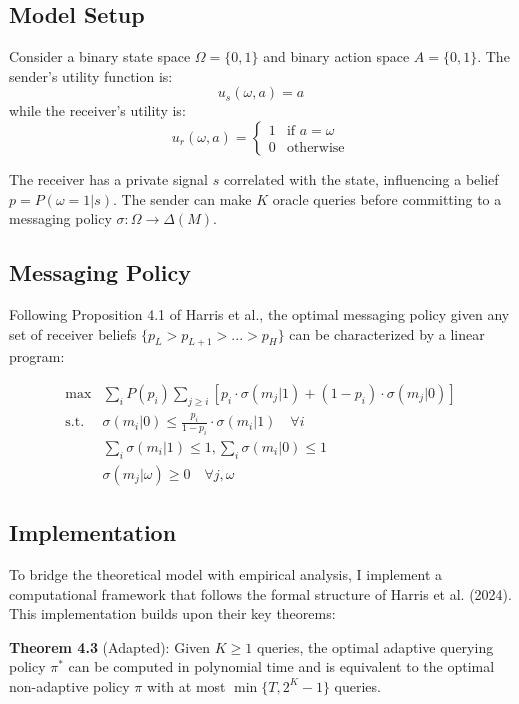 \documentclass[12pt]{article}
\theoremstyle{plain}
\theoremstyle{definition}
\theoremstyle{remark}
\begin{document}
\subsection{Model Setup}
Consider a binary state space $\Omega = \{0,1\}$ and binary action space $A = \{0,1\}$. The sender's utility function is:
\begin{equation}
    u_s(\omega,a) = a
\end{equation}
while the receiver's utility is:
\begin{equation}
    u_r(\omega,a) = \begin{cases}
        1 & \text{if } a = \omega \\
        0 & \text{otherwise}
    \end{cases}
\end{equation}

The receiver has a private signal $s$ correlated with the state, influencing a belief $p = P(\omega=1|s)$. The sender can make $K$ oracle queries before committing to a messaging policy $\sigma: \Omega \rightarrow \Delta(M)$.

\subsection{Messaging Policy}
Following Proposition 4.1 of Harris et al., the optimal messaging policy given any set of receiver beliefs $\{p_L > p_{L+1} > ... > p_H\}$ can be characterized by a linear program:

\begin{align*}
    \max &\sum_i P(p_i) \sum_{j\geq i} [p_i\cdot\sigma(m_j|1) + (1-p_i)\cdot\sigma(m_j|0)] \\
    \text{s.t. } &\sigma(m_i|0) \leq \frac{p_i}{1-p_i}\cdot\sigma(m_i|1) \quad \forall i \\
    &\sum_i \sigma(m_i|1) \leq 1, \sum_i \sigma(m_i|0) \leq 1 \\
    &\sigma(m_j|\omega) \geq 0 \quad \forall j,\omega
\end{align*}

\subsection{Implementation}
To bridge the theoretical model with empirical analysis, I implement a computational framework that follows the formal structure of Harris et al. (2024). This implementation builds upon their key theorems:

\textbf{Theorem 4.3} (Adapted): Given $K \geq 1$ queries, the optimal adaptive querying policy $\pi^*$ can be computed in polynomial time and is equivalent to the optimal non-adaptive policy $\pi$ with at most $\min\{T, 2^K - 1\}$ queries.
\end{document}
